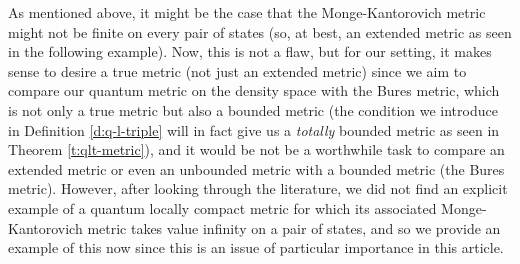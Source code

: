 \documentclass{amsart}
\theoremstyle{plain}
\theoremstyle{definition}
\theoremstyle{remark}
\numberwithin{equation}{section}
\begin{document}
As mentioned above, it might be the case that the Monge-Kantorovich metric might not be finite on every pair of states (so, at best, an extended metric as seen in the following example). Now, this is not a flaw, but for our setting, it makes sense to desire a true metric (not just an extended metric) since we aim to compare our quantum metric on the density space with the Bures metric, which is not only a true metric but also a bounded metric (the condition we introduce in Definition \ref{d:q-l-triple} will in fact give us a {\em totally} bounded metric  as seen in Theorem \ref{t:qlt-metric}), and it would be not be a worthwhile task to compare an extended metric or even an unbounded metric with a bounded metric (the Bures metric). However, after looking through the literature, we did not find an explicit  example of a quantum locally compact metric for which its associated Monge-Kantorovich metric takes value infinity on a pair of states, and so we provide an example of this now since this is an issue of particular importance in this article.
\end{document}
